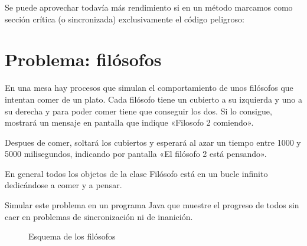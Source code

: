 \documentclass[letterpaper,10pt,spanish]{sphinxmanual}
\begin{document}
Se puede aprovechar todavía más rendimiento si en un método marcamos como sección crítica (o sincronizada) exclusivamente el código peligroso:

%
\begin{sphinxVerbatim}[commandchars=\\\{\}]
   
                 
\end{sphinxVerbatim}


\section{Problema: filósofos}
\label{\detokenize{textos/tema2:problema-filosofos}}
En una mesa hay procesos que simulan el comportamiento de unos filósofos que intentan comer de un plato. Cada filósofo tiene un cubierto a su izquierda y uno a su derecha y para poder comer tiene que conseguir los dos. Si lo consigue, mostrará un mensaje en pantalla que indique «Filosofo 2 comiendo».

Despues de comer, soltará los cubiertos y esperará al azar un tiempo entre 1000 y 5000 milisegundos, indicando por pantalla «El filósofo 2 está pensando».

En general todos los objetos de la clase Filósofo está en un bucle infinito dedicándose a comer y a pensar.

Simular este problema en un programa Java que muestre el progreso de todos sin caer en problemas de sincronización ni de inanición.

\begin{figure}[htbp]
\centering
\capstart

\noindent{}
\caption{Esquema de los filósofos}\label{\detokenize{textos/tema2:id5}}\end{figure}
\end{document}
